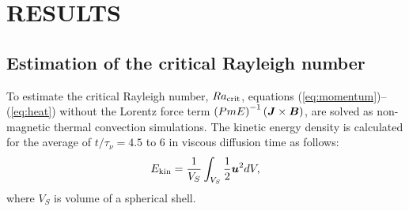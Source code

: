 \section{RESULTS}

\subsection{Estimation of the critical Rayleigh number}

To estimate the critical Rayleigh number, $Ra_{\rm crit}$, equations (\ref{eq:momentum})--(\ref{eq:heat}) without the Lorentz force term $\left(Pm E\right)^{-1} \left(\mbox{\boldmath$J$} \times \mbox{\boldmath$B$} \right)$, are solved as non-magnetic thermal convection simulations.
The kinetic energy density is calculated for the average of $t / \tau_{\nu} = 4.5$ to 6 in viscous diffusion time as follows: 
%
\begin{equation}
E_{\rm kin} = \frac{1}{V_{S}} \int_{V_{S}} \frac{1}{2} \mbox{\boldmath$u$}^{2} dV,
\label{eq:kinetic_energy}
\end{equation}
%
where $V_{S}$ is volume of a spherical shell.

